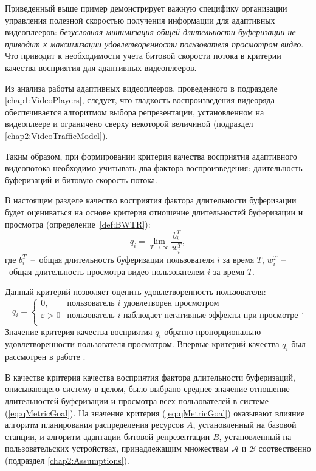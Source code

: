 Приведенный выше пример демонстрирует важную специфику организации управления полезной скоростью получения информации для адаптивных видеоплееров: \textit{безусловная минимизация общей длительности буферизации не приводит к максимизации удовлетворенности пользователя просмотром видео}. Что приводит к необходимости учета битовой скорости потока в критерии качества восприятия для адаптивных видеоплееров.

Из анализа работы адаптивных видеоплееров, проведенного в подразделе \ref{chap1:VideoPlayers}, следует, что гладкость воспроизведения видеоряда обеспечивается алгоритмом выбора репрезентации, установленном на видеоплеере и ограничено сверху некоторой величиной (подраздел \ref{chap2:VideoTrafficModel}).

Таким образом, при формировании критерия качества восприятия адаптивного видеопотока необходимо учитывать два фактора воспроизведения: длительность буферизаций и битовую скорость потока.

В настоящем разделе качество восприятия фактора длительности буферизации будет оцениваться на основе критерия отношение длительностей буферизации и просмотра (определение~\ref{def:BWTR}): $$q_i = \lim\limits_{T\rightarrow\infty} \frac{b_i^T}{w_i^T},$$
где $b_i^T$~--~общая длительность буферизации пользователя $i$ за время $T$, $w_i^T$~--~общая длительность просмотра видео пользователем $i$ за время $T$.

Данный критерий позволяет оценить удовлетворенность пользователя:
$$q_i=
\begin{cases}
0, & \text{пользователь $i$ удовлетворен просмотром}\\
\varepsilon > 0 & \text{пользователь $i$ наблюдает негативные эффекты при просмотре}\\
\end{cases}.
$$
Значение критерия качества восприятия $q_i$ обратно пропорционально удовлетворенности пользователя просмотром. Впервые критерий качества $q_i$ был рассмотрен в работе \cite{Bakin_Globecom}.

В качестве критерия качества восприятия фактора длительности буферизаций, описывающего систему в целом, было выбрано среднее значение отношение длительностей буферизации и просмотра всех пользователей в системе (\ref{eq:qMetricGoal}). На значение критерия (\ref{eq:qMetricGoal}) оказывают влияние алгоритм планирования распределения ресурсов $A$, установленный на базовой станции, и алгоритм адаптации битовой репрезентации $B$, установленный на пользовательских устройствах, принадлежащим множествам $\mathcal{A}$ и $\mathcal{B}$ соотвественно (подраздел \ref{chap2:Assumptions}).


